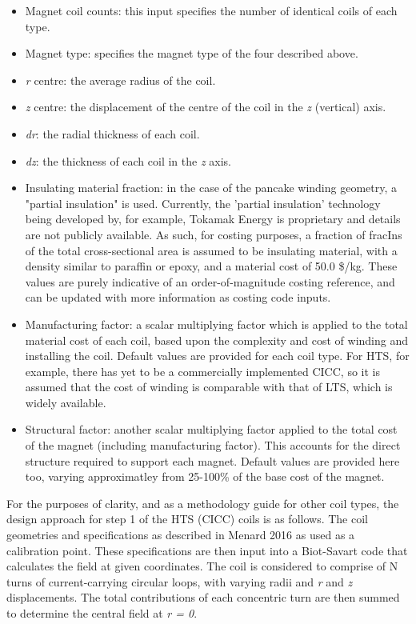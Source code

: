 \begin{itemize}
    \item Magnet coil counts: this input specifies the number of identical coils of each type.
    \item Magnet type: specifies the magnet type of the four described above.
    \item \textit{r} centre: the average radius of the coil.
    \item \textit{z} centre: the displacement of the centre of the coil in the \textit{z} (vertical) axis.
    \item \textit{dr}: the radial thickness of each coil.
    \item \textit{dz}: the thickness of each coil in the \textit{z} axis.
    \item Insulating material fraction: in the case of the pancake winding geometry, a "partial insulation" is used. Currently, the 'partial insulation' technology being developed by, for example, Tokamak Energy is proprietary and details are not publicly available. As such, for costing purposes, a fraction of fracIns of the total cross-sectional area is assumed to be insulating material, with a density similar to paraffin or epoxy, and a material cost of 50.0 \$/kg. These values are purely indicative of an order-of-magnitude costing reference, and can be updated with more information as costing code inputs.
    \item Manufacturing factor: a scalar multiplying factor which is applied to the total material cost of each coil, based upon the complexity and cost of winding and installing the coil. Default values are provided for each coil type. For HTS, for example, there has yet to be a commercially implemented CICC, so it is assumed that the cost of winding is comparable with that of LTS, which is widely available. 
    \item Structural factor: another scalar multiplying factor applied to the total cost of the magnet (including manufacturing factor). This accounts for the direct structure required to support each magnet. Default values are provided here too, varying approximatley from 25-100\% of the base cost of the magnet.
\end{itemize}

For the purposes of clarity, and as a methodology guide for other coil types, the design approach for step 1 of the HTS (CICC) coils is as follows. The coil geometries and specifications as described in Menard 2016 \cite{Menard2016} as used as a calibration point. These specifications are then input into a Biot-Savart code that calculates the field at given coordinates. The coil is considered to comprise of N turns of current-carrying circular loops, with varying radii and \textit{r} and \textit{z} displacements. The total contributions of each concentric turn are then summed to determine the central field at \textit{r = 0}.

